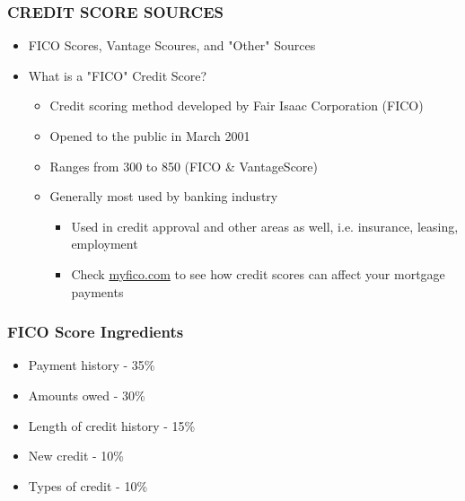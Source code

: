 \documentclass[12pt]{article}
\begin{document}
            \subsubsection{CREDIT SCORE SOURCES}
                \begin{itemize}
                    \item FICO Scores, Vantage Scoures, and "Other" Sources
                    \item What is a "FICO" Credit Score?
                        \begin{itemize}
                            \item Credit scoring method developed by Fair Isaac Corporation (FICO)
                            \item Opened to the public in March 2001
                            \item Ranges from 300 to 850 (FICO \& VantageScore)
                            \item Generally most used by banking industry
                                \begin{itemize}
                                    \item Used in credit approval and other areas as well, i.e. insurance, leasing, employment
                                    \item Check \href{https://www.myfico.com/}{myfico.com} to see how credit scores can affect
                                        your mortgage payments
                                \end{itemize}
                        \end{itemize}
                \end{itemize}
            \subsubsection{FICO Score Ingredients}
                \begin{itemize}
                    \item Payment history - 35\%
                    \item Amounts owed - 30\%
                    \item Length of credit history - 15\%
                    \item New credit - 10\%
                    \item Types of credit - 10\%
                \end{itemize}
\end{document}
